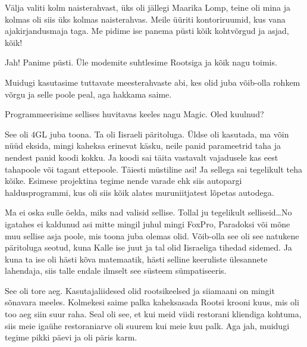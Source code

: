 Välja valiti kolm naisterahvast, üks oli jällegi Maarika Lomp, teine oli mina ja kolmas oli siis üks kolmas naisterahvas. Meile 
üüriti kontoriruumid, kus vana ajakirjandusmaja taga. Me pidime ise panema 
püsti kõik kohtvõrgud ja asjad, kõik! 


Jah! Panime püsti. Üle modemite suhtlesime Rootsiga ja kõik nagu toimis. 

Muidugi kasutasime tuttavate meesterahvaste abi, kes olid juba võib-olla rohkem 
 võrgu ja selle poole peal, aga hakkama saime. 

Programmeerisime sellises huvitavas keeles nagu Magic. Oled 
kuulnud? 


See oli 4GL juba toona. Ta oli Iisraeli päritoluga. Üldse 
oli kasutada,  ma võin nüüd eksida, mingi kaheksa erinevat käsku, neile panid 
parameetrid taha ja nendest panid koodi kokku. Ja koodi sai täita vastavalt 
vajadusele kas eest tahapoole või tagant ettepoole. Täiesti müstiline asi! Ja 
sellega sai tegelikult teha kõike. Esimese projektina tegime nende varade ehk 
siis autopargi haldusprogrammi, kus oli siis kõik alates muruniitjatest lõpetas 
autodega. 


Ma ei oska sulle öelda, miks nad valisid sellise. Tollal ju tegelikult 
selliseid\ldots No igatahes ei kaldunud asi mitte mingil juhul mingi FoxPro, 
Paradoksi või mõne muu sellise asja poole, mis toona juba olemas olid. 
Võib-olla see oli see natukene päritoluga seotud, kuna Kalle ise juut ja tal 
olid Iisraeliga tihedad sidemed. Ja kuna ta ise oli hästi kõva matemaatik, 
hästi selline keeruliste ülesannete lahendaja, siis talle endale ilmselt see 
süsteem sümpatiseeris. 

See oli tore aeg. Kasutajaliidesed olid rootsikeelsed ja siiamaani on mingit 
sõnavara meeles. Kolmekesi saime palka kaheksasada Rootsi krooni kuus, mis oli 
too aeg siin suur raha. Seal oli see, et kui meid viidi restorani kliendiga 
kohtuma, siis meie igaühe restoraniarve oli suurem kui meie kuu palk. Aga jah, 
muidugi tegime  pikki päevi ja oli päris karm. 

